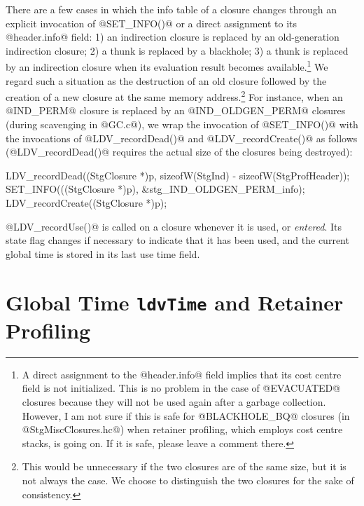 \documentclass{article}
\begin{document}
There are a few cases in which the info table of a closure changes through
an explicit invocation of @SET_INFO()@ or a direct assignment to its @header.info@
field: 1) an indirection closure is replaced by an old-generation 
indirection closure; 2) a thunk is replaced by a blackhole; 3) a thunk is replaced 
by an indirection closure when its evaluation result becomes available.\footnote{A 
direct assignment to the @header.info@ field implies that its cost centre 
field is not initialized. This is no problem in the case of @EVACUATED@ closures 
because they will 
not be used again after a garbage collection. However, I am not sure if this is safe
for @BLACKHOLE\_BQ@ closures (in @StgMiscClosures.hc@) when retainer profiling, 
which employs cost centre stacks, is going on. 
If it is safe, please leave a comment there.}
We regard such a situation as
the destruction of an old closure followed by the creation of a new closure
at the same memory address.\footnote{This would be unnecessary if the two closures
are of the same size, but it is not always the case. We choose to distinguish
the two closures for the sake of consistency.}
For instance, when an @IND_PERM@ closure is replaced by an @IND_OLDGEN_PERM@
closures (during scavenging in @GC.c@), we wrap the invocation of @SET_INFO()@ with 
the invocations of @LDV_recordDead()@ and @LDV_recordCreate()@ as follows 
(@LDV_recordDead()@ requires the actual size of the closures being destroyed):

\begin{code}
  LDV_recordDead((StgClosure *)p, sizeofW(StgInd) - sizeofW(StgProfHeader));
  SET_INFO(((StgClosure *)p), &stg_IND_OLDGEN_PERM_info);
  LDV_recordCreate((StgClosure *)p);
\end{code}

@LDV_recordUse()@ is called on a closure whenever it is used, or \emph{entered}.
Its state flag changes if necessary to indicate that it has been used, and
the current global time is stored in its last use time field. 

\section{Global Time \texttt{ldvTime} and Retainer Profiling}
\end{document}
